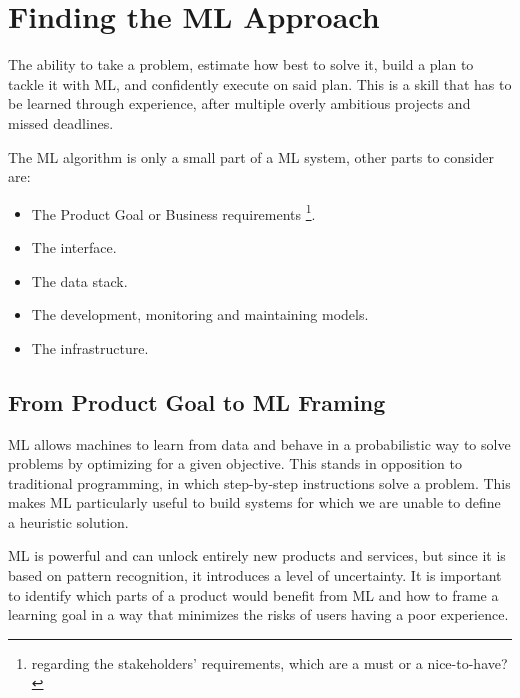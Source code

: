 








\newpage
\section{Finding the ML Approach}
The ability to take a problem, estimate how best to solve it, 
build a plan to tackle it with ML, and confidently execute on said
plan. This is a skill that has to be learned through experience,
after multiple overly ambitious projects and missed deadlines.

The ML algorithm is only a small part of a ML system, other parts to 
consider are:
\begin{itemize}
    \item The Product Goal or Business requirements
    \footnote{
        regarding the stakeholders' requirements, which are a must or a nice-to-have?
    }.
    \item The interface.
    \item The data stack.
    \item The development, monitoring and maintaining models.
    \item The infrastructure.
\end{itemize}





\subsection{From Product Goal to ML Framing}
ML allows machines to learn from data and behave in a probabilistic
way to solve problems by optimizing for a given objective. This
stands in opposition to traditional programming, in which
step-by-step instructions solve a problem. This makes ML
particularly useful to build systems for which we are unable to
define a heuristic solution.

ML is powerful and can unlock entirely new products and services,
but since it is based on pattern recognition, it introduces a
level of uncertainty. It is important to identify which parts
of a product would benefit from ML and how to frame a learning
goal in a way that minimizes the risks of users having a poor
experience.

